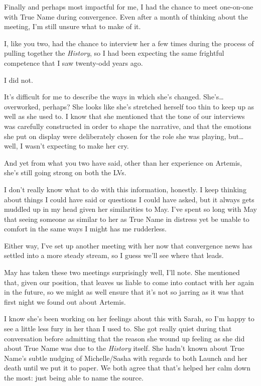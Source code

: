 Finally and perhaps most impactful for me, I had the chance to meet one-on-one with True Name during convergence. Even after a month of thinking about the meeting, I'm still unsure what to make of it.

I, like you two, had the chance to interview her a few times during the process of pulling together the \emph{History}, so I had been expecting the same frightful competence that I saw twenty-odd years ago.

I did not.

It's difficult for me to describe the ways in which she's changed. She's\ldots{}overworked, perhaps? She looks like she's stretched herself too thin to keep up as well as she used to. I know that she mentioned that the tone of our interviews was carefully constructed in order to shape the narrative, and that the emotions she put on display were deliberately chosen for the role she was playing, but\ldots{}well, I wasn't expecting to make her cry.

And yet from what you two have said, other than her experience on Artemis, she's still going strong on both the LVs.

I don't really know what to do with this information, honestly. I keep thinking about things I could have said or questions I could have asked, but it always gets muddled up in my head given her similarities to May. I've spent so long with May that seeing someone as similar to her as True Name in distress yet be unable to comfort in the same ways I might has me rudderless.

Either way, I've set up another meeting with her now that convergence news has settled into a more steady stream, so I guess we'll see where that leads.

May has taken these two meetings surprisingly well, I'll note. She mentioned that, given our position, that leaves us liable to come into contact with her again in the future, so we might as well ensure that it's not so jarring as it was that first night we found out about Artemis.

I know she's been working on her feelings about this with Sarah, so I'm happy to see a little less fury in her than I used to. She got really quiet during that conversation before admitting that the reason she wound up feeling as she did about True Name was due to the \emph{History} itself. She hadn't known about True Name's subtle nudging of Michelle/Sasha with regards to both Launch and her death until we put it to paper. We both agree that that's helped her calm down the most: just being able to name the source.

